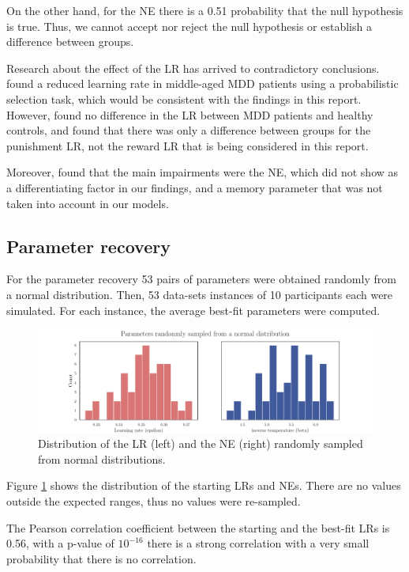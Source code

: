 \documentclass[12pt]{article}
\begin{document}
On the other hand, for the NE there is a 0.51 probability that the null hypothesis is true. Thus, we cannot accept nor reject the null hypothesis or establish a difference between groups.

Research about the effect of the LR has arrived to contradictory conclusions. \cite{chase2010approach} found a reduced learning rate in middle-aged MDD patients using a probabilistic selection task, which would be consistent with the findings in this report. However, \cite{gradin} found no difference in the LR between MDD patients and healthy controls, and \cite{dombrovski2010reward} found that there was only a difference between groups for the punishment LR, not the reward LR that is being considered in this report.

Moreover, \cite{series} found that the main impairments were the NE, which did not show as a differentiating factor in our findings, and a memory parameter that was not taken into account in our models.

\subsection{Parameter recovery}

For the parameter recovery 53 pairs of parameters were obtained randomly from a normal distribution. Then, 53 data-sets instances of 10 participants each were simulated. For each instance, the average best-fit parameters were computed.

\begin{figure}[h!]
	\centering
	\hspace*{-0.6in}
	\includegraphics[width=1.15\linewidth]{figures/2.5.0.pdf}
	\caption{Distribution of the LR (left) and the NE (right) randomly sampled from normal distributions.}
	\label{fig:2.5.0}
\end{figure}


Figure \ref{fig:2.5.0} shows the distribution of the starting LRs and NEs. There are no values outside the expected ranges, thus no values were re-sampled.

The Pearson correlation coefficient between the starting and the best-fit LRs is 0.56, with a p-value of $10^{-16}$ there is a strong correlation with a very small probability that there is no correlation.
\end{document}
